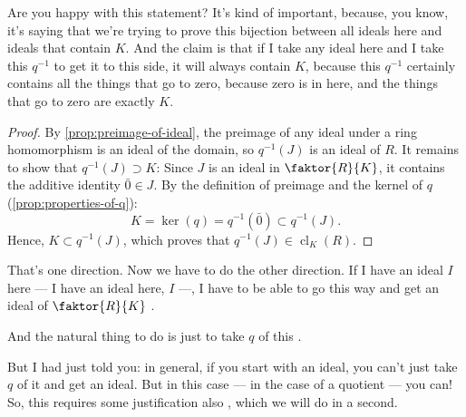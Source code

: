 \begin{proofWrapper}
\begin{speech}[00:20:07 - 00:22:05]
Are you happy with this statement? It's kind of important, because, you know, it's saying that we're trying to prove this bijection between all ideals here and ideals that contain $K$. And the claim is that if I take any ideal here and I take this $q^{-1}$ to get it to this side, it will always contain $K$, because this $q^{-1}$ certainly contains all the things that go to zero, because zero is in here, and the things that go to zero are exactly $K$.
\end{speech}

\begin{content}

\begin{proof}
By \cref{prop:preimage-of-ideal}, the preimage of any ideal under a ring homomorphism is an ideal of the domain, so $q^{-1}(J)$ is an ideal of $R$.
It remains to show that $q^{-1}(J) \supset K$:
Since $J$ is an ideal in $\faktor{R}{K}$, it contains the additive identity $\bar{0} \in J$. By the definition of preimage and the kernel of $q$ (\cref{prop:properties-of-q}):
\[
K = \ker(q) = q^{-1}(\bar{0}) \subset q^{-1}(J).
\]
Hence, $K \subset q^{-1}(J)$, which proves that $q^{-1}(J) \in \operatorname{cl}_K(R)$.
\end{proof}
\end{content}

\begin{speech}[00:22:05 - 00:23:35]
That's one direction. Now we have to do the other direction. If I have an ideal $I$ here  --- I have an ideal here, $I$ ---, I have to be able to go this way and get an ideal of $\faktor{R}{K}$ .

And the natural thing to do is just to take $q$ of this .

But I had just told you: in general, if you start with an ideal, you can't just take $q$ of it and get an ideal. But in this case --- in the case of a quotient --- you can! So, this requires some justification also , which we will do in a second.


\end{speech}
\end{proofWrapper}
